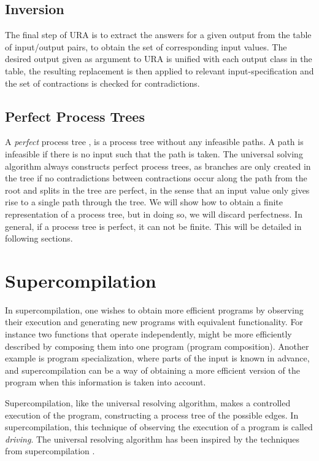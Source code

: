 \documentclass[10pt]{../sigplanconf}
\begin{document}
\subsection{Inversion}
The final step of URA is to extract the answers for a given output
from the table of input/output pairs, to obtain the set of
corresponding input values. The desired output given as argument to
URA is unified with each output class in the table, the resulting
replacement is then applied to relevant input-specification and the
set of contractions is checked for contradictions.

\subsection{Perfect Process Trees}
A \textit{perfect} process tree \cite{gluck1993occam}, is a process
tree without any infeasible paths. A path is infeasible if there is no
input such that the path is taken. The universal solving algorithm
always constructs perfect process trees, as branches are only created
in the tree if no contradictions between contractions occur along the
path from the root and splits in the tree are perfect, in the sense
that an input value only gives rise to a single path through the
tree. We will show how to obtain a finite representation of a process
tree, but in doing so, we will discard perfectness. In general, if a
process tree is perfect, it can not be finite. This will be detailed
in following sections.

\section{Supercompilation}
\label{sec:supercompilation}
In supercompilation, one wishes to obtain more efficient programs by
observing their execution and generating new programs with equivalent
functionality. For instance two functions that operate independently,
might be more efficiently described by composing them into one program
(program composition). Another example is program specialization,
where parts of the input is known in advance, and supercompilation can
be a way of obtaining a more efficient version of the program when
this information is taken into account.

Supercompilation, like the universal resolving algorithm, makes a
controlled execution of the program, constructing a process tree of
the possible edges. In supercompilation, this technique of observing
the execution of a program is called \textit{driving}. The universal
resolving algorithm has been inspired by the techniques from
supercompilation \cite{abramov2002principles}.
\end{document}
